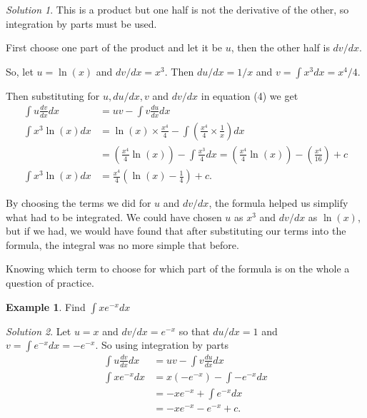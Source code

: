 \documentclass[
  11pt,
  oneside]{book}
\newcommand{\slide}{}
\theoremstyle{definition}
\theoremstyle{definition}
\newtheorem{example}{Example}[chapter]
\theoremstyle{definition}
\theoremstyle{definition}
\theoremstyle{remark}
\newtheorem*{solution}{Solution}
\begin{document}
\begin{solution}
This is a product but one half is not the derivative of the other, so integration by parts must be used.

First choose one part of the product and let it be \(u\), then the other half is \(dv/dx\).

So, let \(u = \ln(x)\) and \(dv/dx = x^3\). Then \(du/dx = 1/x\) and \(v=\displaystyle\int x^3dx = x^4/4\).

Then substituting for \(u, du/dx, v\) and \(dv/dx\) in equation (4) we get
\begin{align*}
\int u\frac{dv}{dx}dx& = uv-\int v\frac{du}{dx}dx\\
\int x^3\ln(x)dx& = \ln(x)\times \frac{x^4}{4} - \int\left(\frac{x^4}{4}\times\frac{1}{x}\right)dx\\
&=\left(\frac{x^4}{4}\ln(x)\right)-\int\frac{x^3}{4}dx = \left(\frac{x^4}{4}\ln(x)\right) - \left(\frac{x^4}{16}\right)+c\\
\int x^3\ln(x)dx& = \frac{x^4}{4}\left(\ln(x)-\frac14\right)+c.
\end{align*}
\end{solution}

\slide

By choosing the terms we did for \(u\) and \(dv/dx\), the formula helped us simplify what had to be integrated. We could have chosen \(u\) as \(x^3\) and \(dv/dx\) as \(\ln(x)\), but if we had, we would have found that after substituting our terms into the formula, the integral was no more simple that before.

Knowing which term to choose for which part of the formula is on the whole a question of practice.

\slide

\begin{example}
Find \(\displaystyle\int xe^{-x}dx\)
\end{example}

\begin{solution}
Let \(u = x\) and \(dv/dx=e^{-x}\) so that \(du/dx = 1\) and \(v=\displaystyle\int e^{-x}dx = -e^{-x}\). So using integration by parts
\begin{align*}
\int u\frac{dv}{dx}dx& = uv-\int v\frac{du}{dx}dx\\
\int xe^{-x}dx&=x(-e^{-x})-\int-e^{-x}dx\\
&=-xe^{-x}+\int e^{-x}dx\\
&=-xe^{-x}-e^{-x}+c.
\end{align*}
\end{solution}
\end{document}
